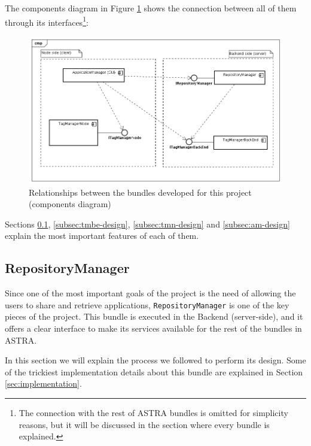 The components diagram in Figure \ref{img:bundles-components-main} shows the
connection between all of them through its interfaces\footnote{The connection
with the rest of ASTRA bundles is omitted for simplicity reasons, but it will 
be discussed in the section where every bundle is explained.}:

\begin{figure}[h!]
 \begin{center}
 \includegraphics[scale=0.4]{diagrams/BundlesComponentsDiagram.png}
  \caption{\label{img:bundles-components-main}Relationships between the bundles
  developed for this project (components diagram)}
 \end{center}
\end{figure}

Sections \ref{subsec:repository-design}, \ref{subsec:tmbe-design},
\ref{subsec:tmn-design} and \ref{subsec:am-design} explain the most important
features of each of them.


\subsection{RepositoryManager}
\label{subsec:repository-design}

Since one of the most important goals of the project is the need of allowing
the users to share and retrieve applications, \verb|RepositoryManager| is one of
the key pieces of the project.
This bundle is executed in the Backend (server-side), and it offers a clear
interface to make its services available for the rest of the bundles
in ASTRA.

In this section we will explain the process we followed to perform its design.
Some of the trickiest implementation details about this bundle are explained
in Section \ref{sec:implementation}.

